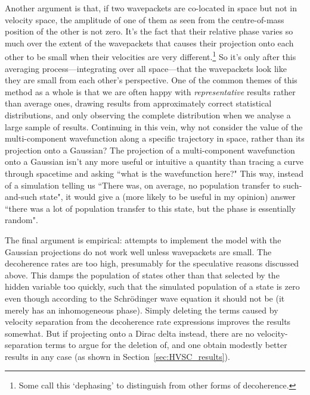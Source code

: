 Another argument is that, if two wavepackets are co-located in space but not in velocity space, the amplitude of one of them as seen from the centre-of-mass position of the other is not zero. It's the fact that their relative phase varies so much over the extent of the wavepackets that causes their projection onto each other to be small when their velocities are very different.\footnote{Some call this `dephasing' to distinguish from other forms of decoherence.} So it's only after this averaging process---integrating over all space---that the wavepackets look like they are small from each other's perspective. One of the common themes of this method as a whole is that we are often happy with \emph{representative} results rather than average ones, drawing results from approximately correct statistical distributions, and only observing the complete distribution when we analyse a large sample of results. Continuing in this vein, why not consider the value of the multi-component wavefunction along a specific trajectory in space, rather than its projection onto a Gaussian? The projection of a multi-component wavefunction onto a Gaussian isn't any more useful or intuitive a quantity than tracing a curve through spacetime and asking ``what is the wavefunction here?" This way, instead of a simulation telling us ``There was, on average, no population transfer to such-and-such state", it would give a (more likely to be useful in my opinion) answer ``there was a lot of population transfer to this state, but the phase is essentially random". 

The final argument is empirical: attempts to implement the model with the Gaussian projections do not work well unless wavepackets are small. The decoherence rates are too high, presumably for the speculative reasons discussed above. This damps the population of states other than that selected by the hidden variable too quickly, such that the simulated population of a state is zero even though according to the Schr\"odinger wave equation it should not be (it merely has an inhomogeneous phase). Simply deleting the terms caused by velocity separation from the decoherence rate expressions improves the results somewhat. But if projecting onto a Dirac delta instead, there are no velocity-separation terms to argue for the deletion of, and one obtain modestly better results in any case (as shown in Section~\ref{sec:HVSC_results}).

